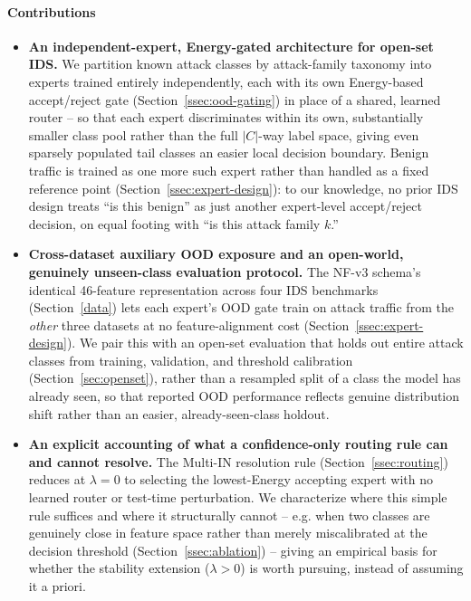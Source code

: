 \documentclass[sigconf]{acmart}
\begin{document}
\paragraph{Contributions}
\begin{itemize}
    \item \textbf{An independent-expert, Energy-gated architecture for open-set IDS.} We partition known attack classes by attack-family taxonomy into experts trained entirely independently, each with its own Energy-based accept/reject gate (Section~\ref{ssec:ood-gating}) in place of a shared, learned router -- so that each expert discriminates within its own, substantially smaller class pool rather than the full $|C|$-way label space, giving even sparsely populated tail classes an easier local decision boundary. Benign traffic is trained as one more such expert rather than handled as a fixed reference point (Section~\ref{ssec:expert-design}): to our knowledge, no prior IDS design treats ``is this benign'' as just another expert-level accept/reject decision, on equal footing with ``is this attack family $k$.''
    \item \textbf{Cross-dataset auxiliary OOD exposure and an open-world, genuinely unseen-class evaluation protocol.} The NF-v3 schema's identical 46-feature representation across four IDS benchmarks (Section~\ref{data}) lets each expert's OOD gate train on attack traffic from the \emph{other} three datasets at no feature-alignment cost (Section~\ref{ssec:expert-design}). We pair this with an open-set evaluation that holds out entire attack classes from training, validation, and threshold calibration (Section~\ref{sec:openset}), rather than a resampled split of a class the model has already seen, so that reported OOD performance reflects genuine distribution shift rather than an easier, already-seen-class holdout.
    \item \textbf{An explicit accounting of what a confidence-only routing rule can and cannot resolve.} The Multi-IN resolution rule (Section~\ref{ssec:routing}) reduces at $\lambda=0$ to selecting the lowest-Energy accepting expert with no learned router or test-time perturbation. We characterize where this simple rule suffices and where it structurally cannot -- e.g. when two classes are genuinely close in feature space rather than merely miscalibrated at the decision threshold (Section~\ref{ssec:ablation}) -- giving an empirical basis for whether the stability extension ($\lambda>0$) is worth pursuing, instead of assuming it a priori.
\end{itemize}
\end{document}

